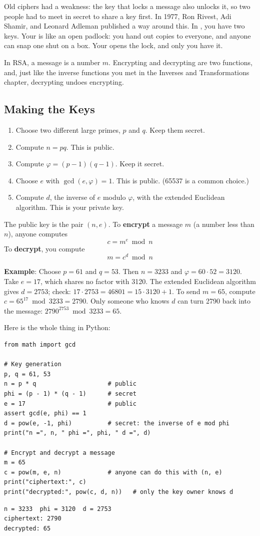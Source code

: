 Old ciphers had a weakness: the key that locks a message also unlocks it, so
two people had to meet in secret to share a key first. In 1977, Ron Rivest,
Adi Shamir, and Leonard Adleman published a way around this. In
, you have two keys. Your 
is like an open padlock: you hand out copies to everyone, and anyone can snap
one shut on a box. Your  opens the lock, and only you
have it.

In RSA, a message is a number $m$. Encrypting and decrypting are two functions,
and, just like the inverse functions you met in the Inverses and Transformations
chapter, decrypting undoes encrypting.

\subsection{Making the Keys}
\begin{enumerate}
\item Choose two different large primes, $p$ and $q$. Keep them secret.
\item Compute $n = pq$. This is public.
\item Compute $\varphi = (p - 1)(q - 1)$. Keep it secret.
\item Choose $e$ with $\gcd(e, \varphi) = 1$. This is public. (65537 is a common choice.)
\item Compute $d$, the inverse of $e$ modulo $\varphi$, with the extended
Euclidean algorithm. This is your private key.
\end{enumerate}
The public key is the pair $(n, e)$. To \textbf{encrypt} a message $m$ (a number
less than $n$), anyone computes
$$c = m^e \bmod n$$
To \textbf{decrypt}, you compute
$$m = c^d \bmod n$$

\textbf{Example}: Choose $p = 61$ and $q = 53$. Then $n = 3233$ and
$\varphi = 60 \cdot 52 = 3120$. Take $e = 17$, which shares no factor with
3120. The extended Euclidean algorithm gives $d = 2753$; check:
$17 \cdot 2753 = 46801 = 15 \cdot 3120 + 1$. To send $m = 65$, compute
$c = 65^{17} \bmod 3233 = 2790$. Only someone who knows $d$ can turn 2790 back
into the message: $2790^{2753} \bmod 3233 = 65$.

Here is the whole thing in Python:
\begin{verbatim}
from math import gcd

# Key generation
p, q = 61, 53
n = p * q                    # public
phi = (p - 1) * (q - 1)      # secret
e = 17                       # public
assert gcd(e, phi) == 1
d = pow(e, -1, phi)          # secret: the inverse of e mod phi
print("n =", n, " phi =", phi, " d =", d)

# Encrypt and decrypt a message
m = 65
c = pow(m, e, n)             # anyone can do this with (n, e)
print("ciphertext:", c)
print("decrypted:", pow(c, d, n))   # only the key owner knows d
\end{verbatim}
\begin{verbatim}
n = 3233  phi = 3120  d = 2753
ciphertext: 2790
decrypted: 65
\end{verbatim}


